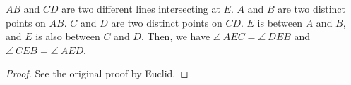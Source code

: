 \begin{proposition}\label{proposition_15}\leanok
    $AB$ and $CD$ are two different lines intersecting at $E$. $A$ and $B$ are two distinct points on $AB$. $C$ and $D$ are two distinct points on $CD$. $E$ is between $A$ and $B$, and $E$ is also between $C$ and $D$. Then, we have $\angle~AEC = \angle~DEB$ and $\angle~CEB = \angle~AED$.
\end{proposition}
\begin{proof}
    \leanok
    See the original proof by Euclid.
\end{proof}
